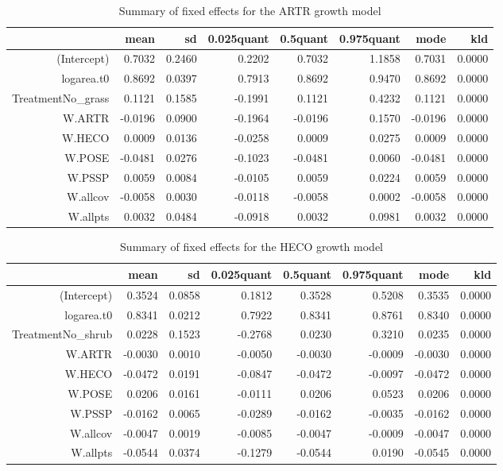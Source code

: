 \begin{table}[ht]
\centering
\caption{Summary of fixed effects for the ARTR growth model} 
\label{ARTRgrowth}
\begin{tabular}{rrrrrrrr}
  \hline
 & mean & sd & 0.025quant & 0.5quant & 0.975quant & mode & kld \\ 
  \hline
(Intercept) & 0.7032 & 0.2460 & 0.2202 & 0.7032 & 1.1858 & 0.7031 & 0.0000 \\ 
  logarea.t0 & 0.8692 & 0.0397 & 0.7913 & 0.8692 & 0.9470 & 0.8692 & 0.0000 \\ 
  TreatmentNo\_grass & 0.1121 & 0.1585 & -0.1991 & 0.1121 & 0.4232 & 0.1121 & 0.0000 \\ 
  W.ARTR & -0.0196 & 0.0900 & -0.1964 & -0.0196 & 0.1570 & -0.0196 & 0.0000 \\ 
  W.HECO & 0.0009 & 0.0136 & -0.0258 & 0.0009 & 0.0275 & 0.0009 & 0.0000 \\ 
  W.POSE & -0.0481 & 0.0276 & -0.1023 & -0.0481 & 0.0060 & -0.0481 & 0.0000 \\ 
  W.PSSP & 0.0059 & 0.0084 & -0.0105 & 0.0059 & 0.0224 & 0.0059 & 0.0000 \\ 
  W.allcov & -0.0058 & 0.0030 & -0.0118 & -0.0058 & 0.0002 & -0.0058 & 0.0000 \\ 
  W.allpts & 0.0032 & 0.0484 & -0.0918 & 0.0032 & 0.0981 & 0.0032 & 0.0000 \\ 
   \hline
\end{tabular}
\end{table}

\begin{table}[ht]
\centering
\caption{Summary of fixed effects for the HECO growth model} 
\label{HECOgrowth}
\begin{tabular}{rrrrrrrr}
  \hline
 & mean & sd & 0.025quant & 0.5quant & 0.975quant & mode & kld \\ 
  \hline
(Intercept) & 0.3524 & 0.0858 & 0.1812 & 0.3528 & 0.5208 & 0.3535 & 0.0000 \\ 
  logarea.t0 & 0.8341 & 0.0212 & 0.7922 & 0.8341 & 0.8761 & 0.8340 & 0.0000 \\ 
  TreatmentNo\_shrub & 0.0228 & 0.1523 & -0.2768 & 0.0230 & 0.3210 & 0.0235 & 0.0000 \\ 
  W.ARTR & -0.0030 & 0.0010 & -0.0050 & -0.0030 & -0.0009 & -0.0030 & 0.0000 \\ 
  W.HECO & -0.0472 & 0.0191 & -0.0847 & -0.0472 & -0.0097 & -0.0472 & 0.0000 \\ 
  W.POSE & 0.0206 & 0.0161 & -0.0111 & 0.0206 & 0.0523 & 0.0206 & 0.0000 \\ 
  W.PSSP & -0.0162 & 0.0065 & -0.0289 & -0.0162 & -0.0035 & -0.0162 & 0.0000 \\ 
  W.allcov & -0.0047 & 0.0019 & -0.0085 & -0.0047 & -0.0009 & -0.0047 & 0.0000 \\ 
  W.allpts & -0.0544 & 0.0374 & -0.1279 & -0.0544 & 0.0190 & -0.0545 & 0.0000 \\ 
   \hline
\end{tabular}
\end{table}

